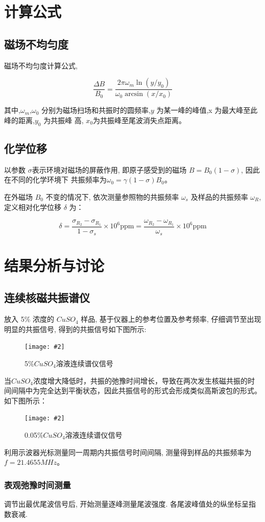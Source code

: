 \documentclass[12pt,a4paper]{article}
\newcommand{\be}[1]{
    \begin{equation}
        #1
    \end{equation}
}
\newcommand{\bfig}[3]{
    \begin{figure}[H]
        \centering
        \texttt{[image: \#2]}
        \caption{#3}
    \end{figure}
}
\begin{document}
\section{计算公式}
\subsection{磁场不均匀度}
磁场不均匀度计算公式\cite{Ernst1987},
\be{\frac{\Delta B}{B_{0}}=\frac{2 \pi \omega_{m} \ln \left(y / y_{0}\right)}{\omega_{0} \arcsin \left(x / x_{0}\right)}}
其中,$\omega_m$,$\omega_0$  分别为磁场扫场和共振时的圆频率,$y$ 为某一峰的峰值,x 为最大峰至此峰的距离,$y_0$ 为共振峰
高, $x_{0}$为共振峰至尾波消失点距离。
\subsection{化学位移}
以参数 $\sigma$表示环境对磁场的屏蔽作用, 即原子感受到的磁场 $B=B_{0}(1-\sigma)$, 因此在不同的化学环境下
共振频率为$\omega_{0}=\gamma(1-\sigma) B_{0}$。

在外磁场 $B_0$ 不变的情况下, 依次测量参照物的共振频率 $\omega_s$ 及样品的共振频率 $\omega_R$, 定义相对化学位移
$\delta$ 为：
\be{\delta=\frac{\sigma_{R_{2}}-\sigma_{R_{1}}}{1-\sigma_{s}} \times 10^{6} \mathrm{ppm}=\frac{\omega_{R_{2}}-\omega_{R_{1}}}{\omega_{s}} \times 10^{6} \mathrm{ppm}}

\section{结果分析与讨论}
\subsection{连续核磁共振谱仪}
放入 5\% 浓度的 $CuS O_4$ 样品, 基于仪器上的参考位置及参考频率, 仔细调节至出现明显的共振信号,
得到的共振信号如下图所示:
\bfig{0.7}{pic.jpeg}{5\%$CuSO_4$溶液连续谱仪信号}
当$CuS O_4$浓度增大降低时，共振的弛豫时间增长，导致在两次发生核磁共振的时间间隔中为完全达到平衡状态，因此共振信号的形式会形成类似高斯波包的形式\cite{Fukushima1981}。如下图所示：
\bfig{0.7}{pic2.jpeg}{0.05\%$CuSO_4$溶液连续谱仪信号}
利用示波器光标测量同一周期内共振信号时间间隔, 测量得到样品的共振频率为 $f = 21.4655MHz$。

\subsubsection{表观弛豫时间测量}
调节出最优尾波信号后, 开始测量逐峰测量尾波强度. 各尾波峰值处的纵坐标呈指数衰减. 
\end{document}
